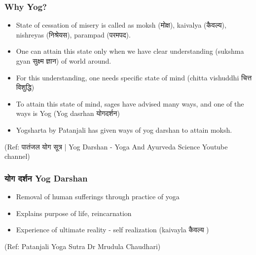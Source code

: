 \begin{frame}[fragile]\frametitle{Why Yog?}

	\begin{itemize}
	\item State of cessation of misery is called as moksh (मोक्ष), kaivalya (कैवल्य), nishreyas (निश्रेयस), parampad (परमपद).
	\item One can attain this state only when we have clear understanding (sukshma gyan सुक्ष्म ज्ञान) of world around.
	\item For this understanding, one needs specific state of mind (chitta vishuddhi चित्त विशुद्धि)
	\item To attain this state of mind, sages have advised many ways, and one of the ways is Yog (Yog dasrhan योगदर्शन)
	\item Yogsharta by Patanjali has given ways of yog darshan to attain moksh.
	\end{itemize}

\tiny{(Ref: पातंजल योग सूत्र | Yog Darshan - Yoga And Ayurveda Science Youtube channel)}

\end{frame}

\begin{frame}[fragile]\frametitle{ योग दर्शन Yog Darshan}

	\begin{itemize}
	\item Removal of human sufferings through practice of yoga
	\item Explains purpose of life, reincarnation
	\item Experience of ultimate reality - self realization (kaivayla कैवल्य )
	\end{itemize}

\tiny{(Ref: Patanjali Yoga Sutra Dr Mrudula Chaudhari)}

\end{frame}

